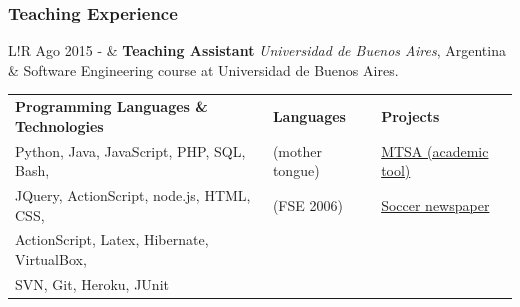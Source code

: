 \documentclass[10pt]{article}
\newcommand\VRule{\color{lightgray}\vrule width 0.5pt}
\begin{document}
\subsubsection*{Teaching Experience}

\begin{tabular}{L!{\VRule}R}
	Ago 2015 - & \textbf{Teaching Assistant} \textit{Universidad de 
		Buenos 
		Aires}, Argentina\\
	& Software Engineering course at Universidad de Buenos Aires.\\
\end{tabular}


%
%
%
%
%


\vspace{1em}
\begin{tabular}{p{7cm} p{4.5cm}p{4.5cm}}
\centering\textbf{Programming Languages \& Technologies} & 
\centering \textbf{Languages} &  \textbf{Projects} \\
\centering Python, Java, JavaScript, PHP, SQL, Bash,  &  \centering {\bf 
Spanish} (mother tongue) & \href{http://mtsa.dc.uba.ar}{MTSA (academic tool)}\\
\centering JQuery, ActionScript, node.js, HTML,  CSS,
& \centering {\bf English} (FSE 2006) & 
\href{http://lapachangafc.herokuapp.com}{Soccer newspaper}\\
\centering ActionScript, Latex,  Hibernate, VirtualBox, & &\\
\centering SVN, Git,  Heroku, JUnit & &\\
\end{tabular}
\end{document}
